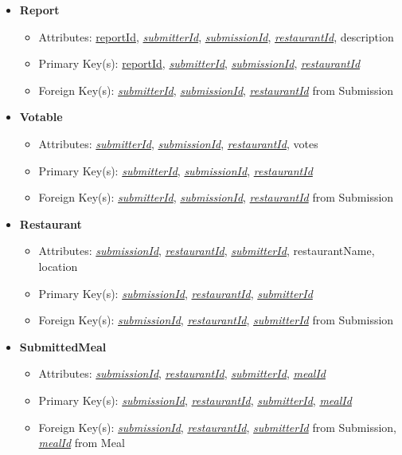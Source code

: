 \documentclass{article}
\begin{document}
\begin{itemize}
        \item \textbf{Report}
        \begin{itemize}
            \item Attributes: \underline{reportId}, \underline{\textit{submitterId}}, \underline{\textit{submissionId}}, \underline{\textit{restaurantId}}, description
            \item Primary Key(s): \underline{reportId}, \underline{\textit{submitterId}}, \underline{\textit{submissionId}}, \underline{\textit{restaurantId}}
            \item Foreign Key(s): \underline{\textit{submitterId}}, \underline{\textit{submissionId}}, \underline{\textit{restaurantId}} from Submission
        \end{itemize}
            
        \item \textbf{Votable}
        \begin{itemize}
            \item Attributes: \underline{\textit{submitterId}}, \underline{\textit{submissionId}}, \underline{\textit{restaurantId}}, votes
            \item Primary Key(s): \underline{\textit{submitterId}}, \underline{\textit{submissionId}}, \underline{\textit{restaurantId}}
            \item Foreign Key(s): \underline{\textit{submitterId}}, \underline{\textit{submissionId}}, \underline{\textit{restaurantId}} from Submission
        \end{itemize}

        \item \textbf{Restaurant}
        \begin{itemize}
            \item Attributes: \underline{\textit{submissionId}}, \underline{\textit{restaurantId}}, \underline{\textit{submitterId}}, restaurantName, location
            \item Primary Key(s): \underline{\textit{submissionId}}, \underline{\textit{restaurantId}}, \underline{\textit{submitterId}}
            \item Foreign Key(s): \underline{\textit{submissionId}}, \underline{\textit{restaurantId}}, \underline{\textit{submitterId}} from Submission
        \end{itemize}

        \item \textbf{SubmittedMeal}
        \begin{itemize}
            \item Attributes: \underline{\textit{submissionId}}, \underline{\textit{restaurantId}}, \underline{\textit{submitterId}}, \underline{\textit{mealId}}
            \item Primary Key(s): \underline{\textit{submissionId}}, \underline{\textit{restaurantId}}, \underline{\textit{submitterId}}, \underline{\textit{mealId}}
            \item Foreign Key(s): \underline{\textit{submissionId}}, \underline{\textit{restaurantId}}, \underline{\textit{submitterId}} from Submission, \underline{\textit{mealId}} from Meal
        \end{itemize}


\end{itemize}
\end{document}
